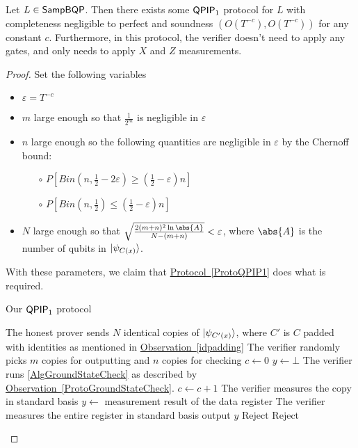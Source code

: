 \begin{theorem}
	Let $L\in\operatorname{\mathsf{SampBQP}}$. Then there exists some $\operatorname{\mathsf{QPIP}}_1$ protocol for $L$ with completeness negligible to perfect and soundness $(O(T^{-c}), O(T^{-c}))$ for any constant $c$. Furthermore, in this protocol, the verifier doesn't need to apply any gates, and only needs to apply $X$ and $Z$ measurements.
\end{theorem}
\begin{proof}
	Set the following variables
	\begin{itemize}
		\item $\varepsilon=T^{-c}$
		\item $m$ large enough so that $\frac{1}{2^m}$ is negligible in $\varepsilon$
		\item $n$ large enough so the following quantities are negligible in $\varepsilon$ by the Chernoff bound:
			\begin{itemize}
				\item[$\circ$] $P\left[Bin(n, \frac{1}{2}-2\varepsilon)\geq\left(\frac{1}{2}-\varepsilon\right)n\right]$
				\item[$\circ$] $P\left[Bin(n, \frac{1}{2})\leq\left(\frac{1}{2}-\varepsilon\right)n\right]$
			\end{itemize}
		\item $N$ large enough so that $\sqrt{\frac{2(m+n)^2\ln\abs{A}}{N-(m+n)}}<\varepsilon$, where $\abs{A}$ is the number of qubits in $\ket{\psi_{C(x)}}$.
	\end{itemize}

	With these parameters, we claim that \hyperref[ProtoQPIP1]{Protocol~\ref*{ProtoQPIP1}} does what is required.
	\begin{algorithm}
		\caption{Our $\operatorname{\mathsf{QPIP}}_1$ protocol}
		\label{ProtoQPIP1}
		\begin{algorithmic}[1]
			\State The honest prover sends $N$ identical copies of $\ket{\psi_{C'(x)}}$, where $C'$ is $C$ padded with identities as mentioned in \hyperref[idpadding]{Observation~\ref*{idpadding}}
			\State The verifier randomly picks $m$ copies for outputting and $n$ copies for checking
			\State $c\gets0$
			\State $y\gets\bot$
				\State The verifier runs \autoref{AlgGroundStateCheck} as described by \hyperref[ProtoGroundStateCheck]{Observation~\ref*{ProtoGroundStateCheck}}.
			        $c\gets c+1$
			    \EndIf
			    \State The verifier measures the copy in standard basis
			            \State $y\gets$ measurement result of the data register
                    \EndIf
			    \EndIf
			    \Else
			    \State The verifier measures the entire register in standard basis
			    \EndIf
			\EndFor
			\State output $y$
			\Else
			\State Reject
			\EndIf
			\Else
			\State Reject
			\EndIf
		\end{algorithmic}
	\end{algorithm}
	

\end{proof}
